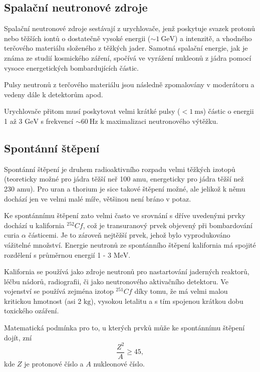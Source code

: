 \documentclass[../../main.tex]{subfiles}
\begin{document}
\subsection{Spalační neutronové zdroje}

Spalační neutronové zdroje sestávají z urychlovače, jenž poskytuje svazek protonů nebo těžších iontů o dostatečně vysoké energii ($\sim 1 ~\mathrm{GeV}$) a intenzitě, a vhodného terčového materiálu složeného z těžkých jader. Samotná spalační energie, jak je známa ze studií kosmického záření, spočívá ve vyrážení nukleonů z jádra pomocí vysoce energetických bombardujících částic.

Pulsy neutronů z terčového materiálu jsou následně zpomalovány v moderátoru a vedeny dále k detektorům apod.

Urychlovače přitom musí poskytovat velmi krátké pulsy ($< 1 ~\mathrm{ms}$) částic o energii 1 až 3 $\mathrm{GeV}$ s frekvencí $\sim 60 ~\mathrm{Hz}$ k maximalizaci neutronového výtěžku.

\subsection{Spontánní štěpení}

Spontánní štěpení je druhem radioaktivního rozpadu velmi těžkých izotopů (teoreticky možné pro jádra těžší neř 100 $\mathrm{amu}$, energeticky pro jádra těžší než 230 $\mathrm{amu}$). Pro uran a thorium je sice takové štěpení možné, ale jelikož k němu dochází jen ve velmi malé míře, většinou není bráno v potaz.

Ke spontánnímu štěpení zato velmi často ve srovnání s dříve uvedenými prvky dochází u kalifornia $^{252}Cf$, což je transuranový prvek objevený při bombardování curia $\alpha$ částicemi. Je to zároveň nejtěžší prvek, jehož bylo vyprodukováno vážitelné množství. Energie neutronů ze spontánního štěpení kalifornia má spojité rozdělení s průměrnou energií 1 - 3 $\mathrm{MeV}$.
	
Kalifornia se používá jako zdroje neutronů pro nastartování jaderných reaktorů, léčbu nádorů, radiografii, či jako neutronového aktivačního detektoru. Ve vojenství se používá zejména izotop $^{251}Cf$ díky tomu, že má velmi malou kritickou hmotnost (asi 2 $\mathrm{kg}$), vysokou letalitu a s tím spojenou krátkou dobu toxického ozáření.

Matematická podmínka pro to, u kterých prvků může ke spontánnímu štěpení dojít, zní
\begin{equation}
\dfrac{Z^2}{A} \geq 45,
\end{equation}	
kde $Z$ je protonové číslo a $A$ nukleonové číslo.
\end{document}
